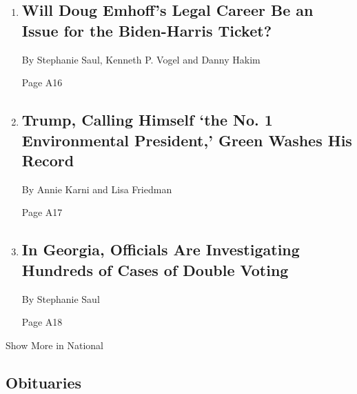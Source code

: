 \begin{enumerate}
\def\labelenumi{\arabic{enumi}.}
\item
  \href{/2020/09/08/us/politics/doug-emhoff-kamala-harris-law.html}{}

  \hypertarget{will-doug-emhoffs-legal-career-be-an-issue-for-the-biden-harris-ticket-1}{%
  \subsection{Will Doug Emhoff's Legal Career Be an Issue for the
  Biden-Harris
  Ticket?}\label{will-doug-emhoffs-legal-career-be-an-issue-for-the-biden-harris-ticket-1}}

  By Stephanie Saul, Kenneth P. Vogel and Danny Hakim

  Page A16
\item
  \href{/2020/09/08/us/politics/trump-drilling-environment-florida.html}{}

  \hypertarget{trump-calling-himself-the-no-1-environmental-president-green-washes-his-record}{%
  \subsection{Trump, Calling Himself `the No. 1 Environmental
  President,' Green Washes His
  Record}\label{trump-calling-himself-the-no-1-environmental-president-green-washes-his-record}}

  By Annie Karni and Lisa Friedman

  Page A17
\item
  \href{/2020/09/08/us/politics/georgia-double-voting.html}{}

  \hypertarget{in-georgia-officials-are-investigating-hundreds-of-cases-of-double-voting}{%
  \subsection{In Georgia, Officials Are Investigating Hundreds of Cases
  of Double
  Voting}\label{in-georgia-officials-are-investigating-hundreds-of-cases-of-double-voting}}

  By Stephanie Saul

  Page A18
\end{enumerate}

Show More in National

\hypertarget{obituaries}{%
\subsection{Obituaries}\label{obituaries}}


